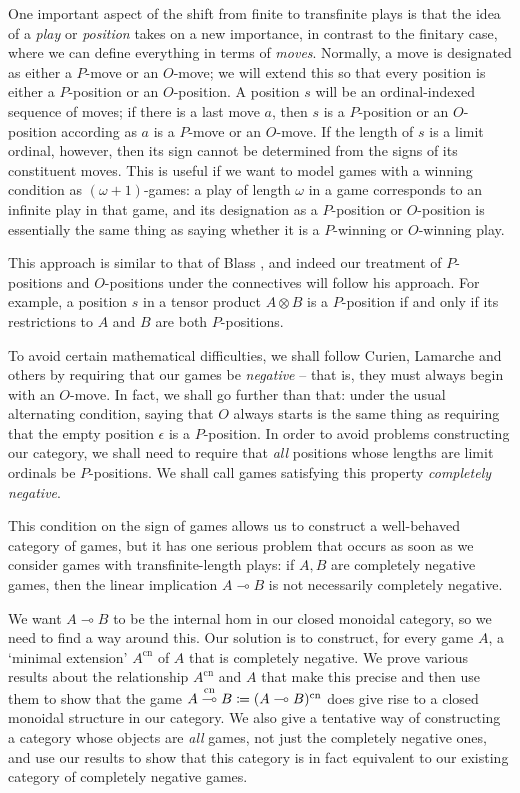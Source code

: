 \documentclass[11pt]{article} %
\theoremstyle{plain} %
\theoremstyle{definition} %
\theoremstyle{note}
\theoremstyle{exercisestyle}
\newcommand{\tensor}{\otimes}
\renewcommand{\implies}{\multimap}
\newcommand{\emptyplay}{\epsilon}
\DeclareMathOperator{\cn}{cn}
\newcommand{\impliescn}{\protect\overset{\cn}{\implies}}
\begin{document}
One important aspect of the shift from finite to transfinite plays is that the idea of a \emph{play} or \emph{position} takes on a new importance, in contrast to the finitary case, where we can define everything in terms of \emph{moves}.  Normally, a move is designated as either a $P$-move or an $O$-move; we will extend this so that every position is either a $P$-position or an $O$-position.  A position $s$ will be an ordinal-indexed sequence of moves; if there is a last move $a$, then $s$ is a $P$-position or an $O$-position according as $a$ is a $P$-move or an $O$-move.  If the length of $s$ is a limit ordinal, however, then its sign cannot be determined from the signs of its constituent moves.  This is useful if we want to model games with a winning condition as $(\omega+1)$-games: a play of length $\omega$ in a game corresponds to an infinite play in that game, and its designation as a $P$-position or $O$-position is essentially the same thing as saying whether it is a $P$-winning or $O$-winning play.  

This approach is similar to that of Blass \cite{blassgames}, and indeed our treatment of $P$-positions and $O$-positions under the connectives will follow his approach.  For example, a position $s$ in a tensor product $A\tensor B$ is a $P$-position if and only if its restrictions to $A$ and $B$ are both $P$-positions.  

To avoid certain mathematical difficulties, we shall follow Curien, Lamarche and others by requiring that our games be \emph{negative} -- that is, they must always begin with an $O$-move.  In fact, we shall go further than that: under the usual alternating condition, saying that $O$ always starts is the same thing as requiring that the empty position $\emptyplay$ is a $P$-position.  In order to avoid problems constructing our category, we shall need to require that \emph{all} positions whose lengths are limit ordinals be $P$-positions.  We shall call games satisfying this property \emph{completely negative}.

This condition on the sign of games allows us to construct a well-behaved category of games, but it has one serious problem that occurs as soon as we consider games with transfinite-length plays: if $A,B$ are completely negative games, then the linear implication $A\implies B$ is not necessarily completely negative.  

We want $A\implies B$ to be the internal hom in our closed monoidal category, so we need to find a way around this.  Our solution is to construct, for every game $A$, a `minimal extension' $A^{\cn}$ of $A$ that is completely negative.  We prove various results about the relationship $A^{\cn}$ and $A$ that make this precise and then use them to show that the game $A\impliescn B\coloneqq (A\implies B)^{\cn}$ does give rise to a closed monoidal structure in our category.  We also give a tentative way of constructing a category whose objects are \emph{all} games, not just the completely negative ones, and use our results to show that this category is in fact equivalent to our existing category of completely negative games.  
\end{document}
